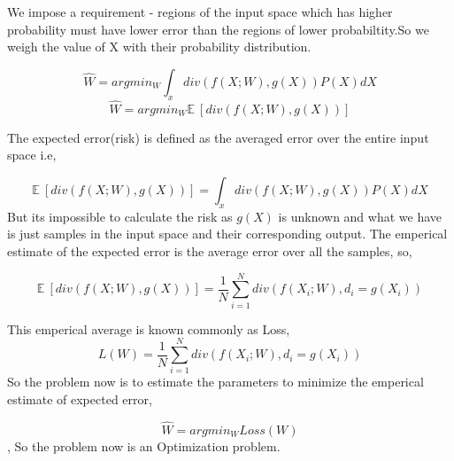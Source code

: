 \documentclass[12pt]{article}
\begin{document}
We  impose a  requirement - regions of the input space which has higher probability must have lower error than the regions of lower probabiltity.So we weigh the value of X with their probability distribution.

$$ \hat{W} = argmin_W \int _x div(f(X;W), g(X))P(X) dX$$
$$ \hat{W} = argmin_W \mathbb{E} \ [ div(f(X;W), g(X)) ]$$

The expected error(risk) is defined as the averaged error over the entire input space i.e,

$$\mathbb{E} \ [ div(f(X;W), g(X)) ] = \int _x div(f(X;W), g(X))P(X) dX $$
But its impossible to calculate the risk as $g(X)$ is unknown and what we have is just samples in the input space and their corresponding output. The emperical estimate of the expected error is the average error over all the samples, so, 

$$\mathbb{E} \ [ div(f(X;W), g(X)) ] = \frac{1}{N} \sum_{i = 1}^{N}  div(f(X_i;W), d_i = g(X_i))$$

This emperical average is known commonly as Loss,
$$L(W) = \frac{1}{N} \sum_{i = 1}^{N}  div(f(X_i;W), d_i = g(X_i))$$
So the problem now is to estimate the parameters to minimize the emperical estimate of expected error,

$$\hat{W} = argmin_W Loss(W)$$, So the problem now is an Optimization problem.
\end{document}
